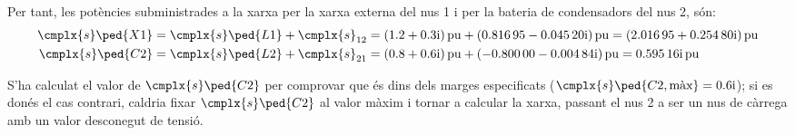 \begin{exemple}
    Per tant, les potències subministrades a la xarxa per la xarxa externa del
    nus 1 i per la bateria de condensadors del nus 2, són:
    \begin{align*}
     \cmplx{s}\ped{X1} &= \cmplx{s}\ped{L1} + \cmplx{s}_{12} = \complexqty{1,2+j0,3}{pu} + \complexqty{0,81695 - j 0,04520}{pu} =
     \complexqty{2,01695 + j 0,25480}{pu} \\
     \cmplx{s}\ped{C2} &= \cmplx{s}\ped{L2} + \cmplx{s}_{21} = \complexqty{0,8+j0,6}{pu} + \complexqty{-0,80000 - j 0,00484}{pu} =
     \complexqty{  j 0,59516}{pu}
    \end{align*}

    S'ha calculat el valor de $\cmplx{s}\ped{C2}$ per  comprovar
    que és dins dels marges especificats
    ($\cmplx{s}\ped{C2,\text{màx}}=\complexnum{j0,6}$); si es donés el cas contrari,
    caldria fixar $\cmplx{s}\ped{C2}$ al  valor màxim i tornar a
    calcular la xarxa, passant el nus 2 a ser un nus de càrrega amb
    un valor  desconegut de tensió.
\end{exemple}

